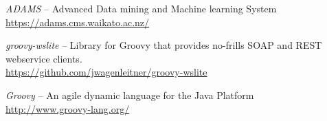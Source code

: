 
\begin{thebibliography}{999}

		\textit{ADAMS} -- Advanced Data mining and Machine learning System \\
		\url{https://adams.cms.waikato.ac.nz/}{}
		
		\textit{groovy-wslite} -- Library for Groovy that provides
		no-frills SOAP and REST webservice clients. \\
		\url{https://github.com/jwagenleitner/groovy-wslite}{}

		\textit{Groovy} -- An agile dynamic language for the Java Platform \\
		\url{http://www.groovy-lang.org/}{}

\end{thebibliography}
